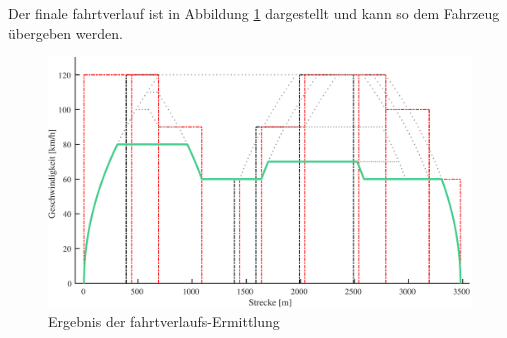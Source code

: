 Der finale \Gls{fahrtverlauf} ist in Abbildung \ref{fig:it13} dargestellt und kann so dem Fahrzeug übergeben werden.
\begin{figure}
  \includegraphics[width=\linewidth]{../images/matlab/it13.pdf}
  \caption{Ergebnis der \Gls{fahrtverlauf}s-Ermittlung}
  \label{fig:it13}
\end{figure}
